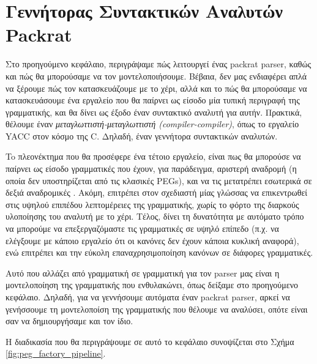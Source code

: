 \chapter{ Γεννήτορας Συντακτικών Αναλυτών Packrat }
\label{ch:packrat_gen}

Στο προηγούμενο κεφάλαιο, περιγράψαμε πώς λειτουργεί ένας packrat parser, καθώς και πώς θα μπορούσαμε να τον μοντελοποιήσουμε. 
Βέβαια, δεν μας ενδιαφέρει απλά να ξέρουμε πώς τον κατασκευάζουμε με το χέρι, αλλά και το πώς θα μπορούσαμε να κατασκευάσουμε ένα εργαλείο που θα παίρνει ως είσοδο μία τυπική περιγραφή της γραμματικής, και θα δίνει ως έξοδο έναν συντακτικό αναλυτή για αυτήν.
Πρακτικά, θέλουμε έναν \textit{μεταγλωττιστή-μεταγλωττιστή (compiler-compiler)}, όπως το εργαλείο YACC στον κόσμο της C. Δηλαδή, έναν γεννήτορα συντακτικών αναλυτών.

To πλεονέκτημα που θα προσέφερε ένα τέτοιο εργαλείο, είναι πως θα μπορούσε να παίρνει ως είσοδο γραμματικές που έχουν, για παράδειγμα, αριστερή αναδρομή (η οποία δεν υποστηρίζεται από τις κλασικές PEGs), και να τις μετατρέπει εσωτερικά σε δεξιά αναδρομικές \cite{Ford2002a}.
Ακόμη, επιτρέπει στον σχεδιαστή μίας γλώσσας να επικεντρωθεί στις υψηλού επιπέδου λεπτομέρειες της γραμματικής, χωρίς το φόρτο της διαρκούς υλοποίησης του αναλυτή με το χέρι. 
Τέλος, δίνει τη δυνατότητα με αυτόματο τρόπο να μπορούμε να επεξεργαζόμαστε τις γραμματικές σε υψηλό επίπεδο (π.χ. να ελέγξουμε με κάποιο εργαλείο ότι οι κανόνες δεν έχουν κάποια κυκλική αναφορά), ενώ επιτρέπει και την εύκολη επαναχρησιμοποίηση κανόνων σε διάφορες γραμματικές.

Αυτό που αλλάζει από γραμματική σε γραμματική για τον parser μας είναι η μοντελοποίηση της γραμματικής που ενθυλακώνει, όπως δείξαμε στο προηγούμενο κεφάλαιο.
Δηλαδή, για να γεννήσουμε αυτόματα έναν packrat parser, αρκεί να γενήσσουμε τη μοντελοποίση της γραμματικής που θέλουμε να αναλύσει, οπότε είναι σαν να δημιουργήσαμε και τον ίδιο.

Η διαδικασία που θα περιγράψουμε σε αυτό το κεφάλαιο συνοψίζεται στο Σχήμα \ref{fig:peg_factory_pipeline}. 


